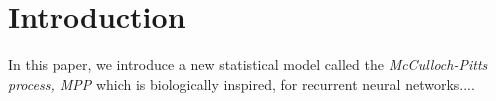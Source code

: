 \section{Introduction}

In this paper, we introduce a new statistical model called the \emph{McCulloch-Pitts process, MPP} which is biologically inspired, for recurrent neural networks....

